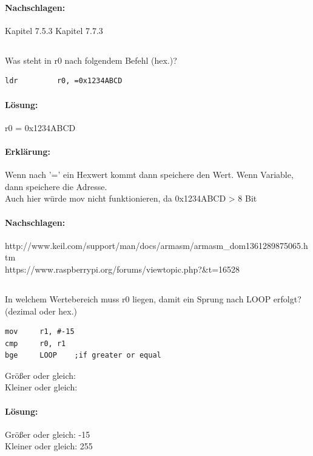 \documentclass[12pt,twoside,a4paper]{article}
\begin{document}
\paragraph*{Nachschlagen:}
Kapitel 7.5.3
Kapitel 7.7.3


\subsection{}
Was steht in r0 nach folgendem Befehl (hex.)?
\begin{lstlisting}
ldr 		r0, =0x1234ABCD
\end{lstlisting}


\paragraph*{Lösung:}
r0 = 0x1234ABCD

\paragraph*{Erklärung:} 
Wenn nach '=' ein Hexwert kommt dann speichere den Wert. Wenn Variable, dann speichere die Adresse.\\
Auch hier würde mov nicht funktionieren, da 0x1234ABCD > 8 Bit\\


\paragraph*{Nachschlagen:}
http://www.keil.com/support/man/docs/armasm/armasm_dom1361289875065.htm\\
https://www.raspberrypi.org/forums/viewtopic.php?&t=16528\\

\subsection{}
In welchem Wertebereich muss r0 liegen, damit ein Sprung nach LOOP erfolgt? (dezimal oder hex.)
\begin{lstlisting}
mov		r1, #-15
cmp		r0, r1
bge		LOOP	;if greater or equal
\end{lstlisting}

Größer oder gleich:\\
Kleiner oder gleich:\\

\paragraph*{Lösung:}
Größer oder gleich: -15\\
Kleiner oder gleich: 255\\
\end{document}
